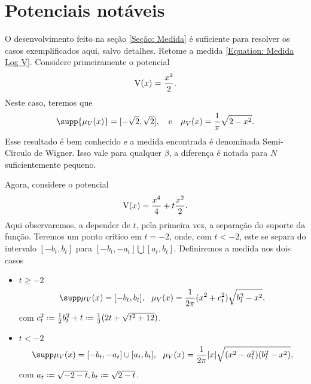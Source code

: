 \section{Potenciais notáveis}
\label{Section: Potencias}

 O desenvolvimento feito na seção \ref{Seção: Medida} é suficiente para resolver os casos exemplificados aqui, salvo detalhes. Retome a medida \ref{Equation: Medida Log V}. Considere primeiramente o potencial $$\operatorname{V}(x) = \frac{x^2}{2}.$$ Neste caso, teremos que
\begin{equation}
	 \supp{\mu_V(x)} = [-\sqrt{2}, \sqrt{2}], \ \ \ \text{e} \ \ \ \mu_V(x) = \frac{1}{\pi} \sqrt{2 - x^2}.
	 \label{Equação: Quadrático}
\end{equation}
Esse resultado é bem conhecido e a medida encontrada é denominada Semi-Círculo de Wigner. Isso vale para qualquer $\beta$, a diferença é notada para $N$ suficientemente pequeno.

Agora, considere o potencial $$\operatorname{V}(x) = \frac{x^4}{4} + t \frac{x^2}{2}.$$ Aqui observaremos, a depender de $t$, pela primeira vez, a separação do suporte da função. Teremos um ponto crítico em $t=-2$, onde, com $t < -2$, este se separa do intervalo $[-b_t, b_t]$ para $[-b_t, -a_t] \bigcup [a_t, b_t]$. Definiremos a medida nos dois casos
\begin{itemize}
	\item \(t \geq -2\)
	\begin{equation}
	\supp \mu_V(x) = [-b_t, b_t], \ \ \mu_V(x) = \frac{1}{2\pi} (x^2 + c_t^2) \sqrt{b_t^2 - x^2},\label{Equação: Quartico +}
	\end{equation}
	com $c_t^2 \deff\frac{1}{2} b_t^2 + t \deff \frac{1}{3} (2t + \sqrt{t^2 + 12})$.
	\item \(t < -2\)
	\begin{equation}
	\supp \mu_V(x) = [-b_t, -a_t] \cup [a_t, b_t], \ \ \mu_V(x) = \frac{1}{2\pi} |x| \sqrt{(x^2 - a_t^2)(b_t^2 - x^2)},
	\label{Equação: Quartico -}
	\end{equation}
	com $ a_t \deff \sqrt{-2-t}, b_t \deff \sqrt{2-t}$.
\end{itemize}





